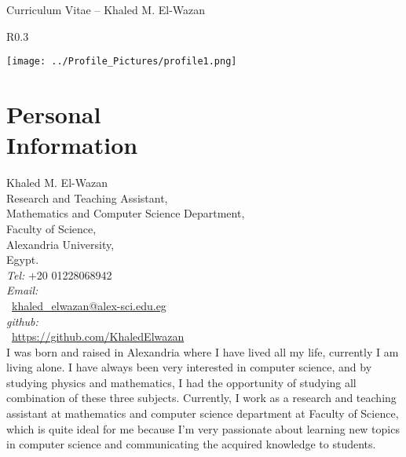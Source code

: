 \documentclass[margin,line,a4paper]{resume}
\begin{document}
{\sc \Large Curriculum Vitae -- Khaled M. El-Wazan}
\begin{resume}
    \vspace{0.5cm}
    \begin{wrapfigure}{R}{0.3\textwidth}
        \vspace{-1cm}
       \begin{center}
       \texttt{[image: ../Profile\_Pictures/profile1.png]}
       \end{center}
        \vspace{-1cm}
    \end{wrapfigure}
    


    \section{\mysidestyle Personal\\Information}%
    Khaled M. El-Wazan \\
    Research and Teaching Assistant,\\
    Mathematics and Computer Science Department,\\
    Faculty of Science,  \\ 
    Alexandria University, \\ 
    Egypt. \\ 
    \emph{Tel:} +20 01228068942\\
    \emph{Email:} \\~\href{mailto:khaled\_elwazan@ alex-sci.edu.eg}{khaled\_elwazan@alex-sci.edu.eg}\\
    \emph{github:} \\~\href{https://github.com/KhaledElwazan}{https://github.com/KhaledElwazan}\\
    
    
    
    
    I was born and raised in Alexandria where I have lived all my life, currently I am living alone.  I have always been very interested in computer science, and  by studying physics and mathematics, I had the opportunity of studying all combination of these three subjects. Currently, I work as a research and teaching assistant at mathematics and computer science department at Faculty of Science, which is quite ideal for me because I'm very passionate about learning new topics in computer science and communicating the acquired knowledge to students. 
    

\end{resume}
\end{document}
